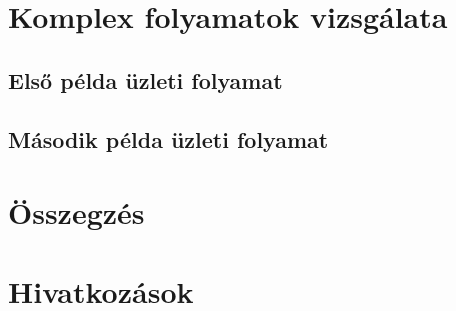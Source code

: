 \documentclass[12pt,a4paper]{book}
\begin{document}

\chapter{Komplex folyamatok vizsgálata}

\section{Első példa üzleti folyamat}


\section{Második példa üzleti folyamat}



\chapter{Összegzés}


\chapter{Hivatkozások}

\end{document}
